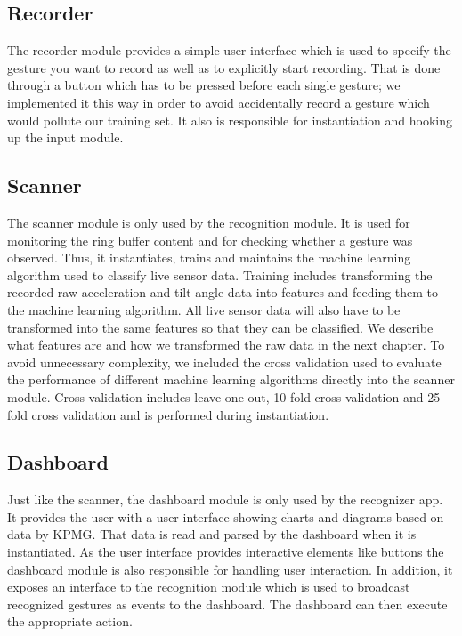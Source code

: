 \subsection{Recorder}
\label{ch:SystemDesign:sec:Components:sub:Recorder}

The recorder module provides a simple user interface which is used to specify the gesture you want to record as well as to explicitly start recording. That is done through a button which has to be pressed before each single gesture; we implemented it this way in order to avoid accidentally record a gesture which would pollute our training set. It also is responsible for instantiation and hooking up the input module.

\subsection{Scanner}
\label{ch:SystemDesign:sec:Components:sub:Scanner}

The scanner module is only used by the recognition module. It is used for monitoring the ring buffer content and for checking whether a gesture was observed. Thus, it instantiates, trains and maintains the machine learning algorithm used to classify live sensor data. Training includes transforming the recorded raw acceleration and tilt angle data into features and feeding them to the machine learning algorithm. All live sensor data will  also have to be transformed into the same features so that they can be classified. We describe what features are and how we transformed the raw data in the next chapter.
To avoid unnecessary complexity, we included the cross validation used to evaluate the performance of different machine learning algorithms directly into the scanner module. Cross validation includes leave one out, 10-fold cross validation and 25-fold cross validation and is performed during instantiation.

\subsection{Dashboard}
\label{ch:SystemDesign:sec:Components:sub:Dashboard}

Just like the scanner, the dashboard module is only used by the recognizer app. It provides the user with a user interface showing charts and diagrams based on data by KPMG. That data is read and parsed by the dashboard when it is instantiated. As the user interface provides interactive elements like buttons the dashboard module is also responsible for handling user interaction. In addition, it exposes an interface to the recognition module which is used to broadcast recognized gestures as events to the dashboard. The dashboard can then execute the appropriate action.

